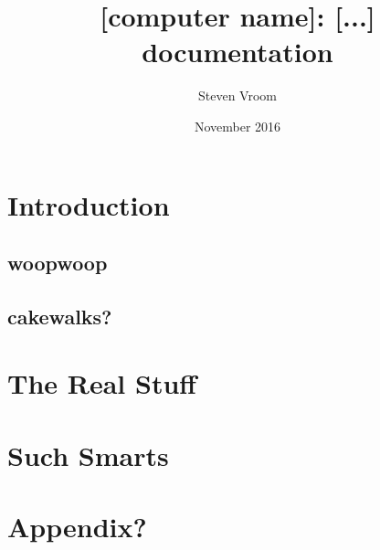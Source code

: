 \documentclass[twoside,a4paper]{memoir}
\begin{document}
\title{[computer name]: [...] documentation}
\author{Steven Vroom}
\date{November 2016}
\maketitle
\cleardoublepage
\tableofcontents
\chapter{Introduction}
\section{woopwoop}
\section{cakewalks?}
\chapter{The Real Stuff}
\chapter{Such Smarts}
\chapter{Appendix?}
\end{document}
